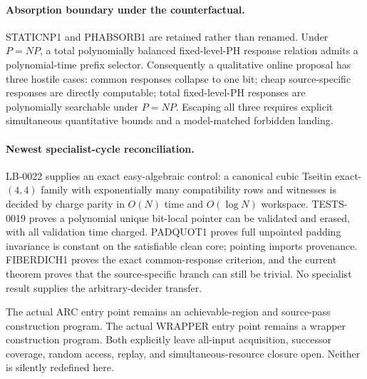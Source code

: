 \documentclass[11pt]{article}
\begin{document}
\paragraph{Absorption boundary under the counterfactual.}
STATICNP1 and PHABSORB1 are retained rather than renamed.  Under $P=NP$, a
total polynomially balanced fixed-level-PH response relation admits a
polynomial-time prefix selector.  Consequently a qualitative online proposal
has three hostile cases: common responses collapse to one bit; cheap
source-specific responses are directly computable; total fixed-level-PH
responses are polynomially searchable under $P=NP$.  Escaping all three
requires explicit simultaneous quantitative bounds and a model-matched
forbidden landing.

\paragraph{Newest specialist-cycle reconciliation.}
LB-0022 supplies an exact easy-algebraic control: a canonical cubic Tseitin
exact-$(4,4)$ family with exponentially many compatibility rows and witnesses
is decided by charge parity in $O(N)$ time and $O(\log N)$ workspace.
TESTS-0019 proves a polynomial unique bit-local pointer can be validated and
erased, with all validation time charged.  PADQUOT1 proves full unpointed
padding invariance is constant on the satisfiable clean core; pointing imports
provenance.  FIBERDICH1 proves the exact common-response criterion, and the
current theorem proves that the source-specific branch can still be trivial.
No specialist result supplies the arbitrary-decider transfer.

The actual ARC entry point  remains an achievable-region and
source-pass construction program.  The actual WRAPPER entry point
 remains a wrapper construction program.  Both explicitly
leave all-input acquisition, successor coverage, random access, replay, and
simultaneous-resource closure open.  Neither is silently redefined here.
\end{document}
